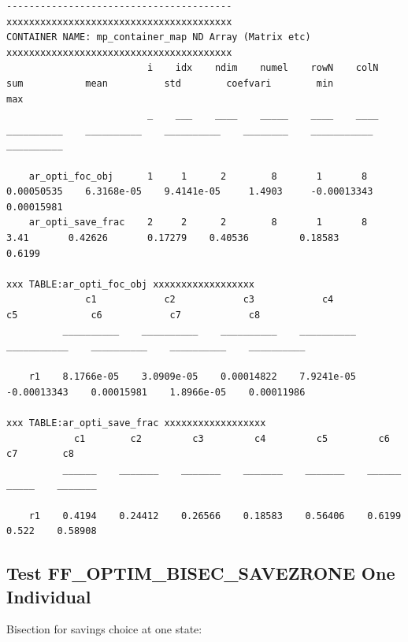 \documentclass[
]{book}
\begin{document}
\begin{verbatim}
----------------------------------------
xxxxxxxxxxxxxxxxxxxxxxxxxxxxxxxxxxxxxxxx
CONTAINER NAME: mp_container_map ND Array (Matrix etc)
xxxxxxxxxxxxxxxxxxxxxxxxxxxxxxxxxxxxxxxx
                         i    idx    ndim    numel    rowN    colN       sum           mean          std        coefvari        min           max    
                         _    ___    ____    _____    ____    ____    __________    __________    __________    ________    ___________    __________

    ar_opti_foc_obj      1     1      2        8       1       8      0.00050535    6.3168e-05    9.4141e-05     1.4903     -0.00013343    0.00015981
    ar_opti_save_frac    2     2      2        8       1       8            3.41       0.42626       0.17279    0.40536         0.18583        0.6199

xxx TABLE:ar_opti_foc_obj xxxxxxxxxxxxxxxxxx
              c1            c2            c3            c4            c5             c6            c7            c8    
          __________    __________    __________    __________    ___________    __________    __________    __________

    r1    8.1766e-05    3.0909e-05    0.00014822    7.9241e-05    -0.00013343    0.00015981    1.8966e-05    0.00011986

xxx TABLE:ar_opti_save_frac xxxxxxxxxxxxxxxxxx
            c1        c2         c3         c4         c5         c6       c7        c8   
          ______    _______    _______    _______    _______    ______    _____    _______

    r1    0.4194    0.24412    0.26566    0.18583    0.56406    0.6199    0.522    0.58908
\end{verbatim}

\hypertarget{test-ff_optim_bisec_savezrone-one-individual}{%
\subsection{Test FF\_OPTIM\_BISEC\_SAVEZRONE One Individual}\label{test-ff_optim_bisec_savezrone-one-individual}}

Bisection for savings choice at one state:
\end{document}
